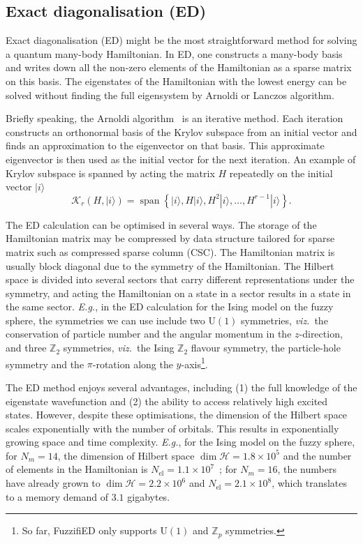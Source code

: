\documentclass{timesjhep}
\begin{document}
\subsection{Exact diagonalisation (ED)}

Exact diagonalisation (ED) might be the most straightforward method for solving a quantum many-body Hamiltonian. In ED, one constructs a many-body basis and writes down all the non-zero elements of the Hamiltonian as a sparse matrix on this basis. The eigenstates of the Hamiltonian with the lowest energy can be solved without finding the full eigensystem by Arnoldi or Lanczos algorithm.

Briefly speaking, the Arnoldi algorithm~\cite{Arnoldi1951} is an iterative method. Each iteration constructs an orthonormal basis of the Krylov subspace from an initial vector and finds an approximation to the eigenvector on that basis. This approximate eigenvector is then used as the initial vector for the next iteration. An example of Krylov subspace is spanned by acting the matrix $H$ repeatedly on the initial vector $|i\rangle$
\begin{equation}
    \mathcal{K}_r(H,|i\rangle)=\operatorname{span}\left\{|i\rangle,H|i\rangle,H^2|i\rangle,\dots,H^{r-1}|i\rangle\right\}.
\end{equation}

The ED calculation can be optimised in several ways. The storage of the Hamiltonian matrix may be compressed by data structure tailored for sparse matrix such as compressed sparse column (CSC). The Hamiltonian matrix is usually block diagonal due to the symmetry of the Hamiltonian. The Hilbert space is divided into several sectors that carry different representations under the symmetry, and acting the Hamiltonian on a state in a sector results in a state in the same sector. \textit{E.g.}, in the ED calculation for the Ising model on the fuzzy sphere, the symmetries we can use include two $\mathrm{U}(1)$ symmetries, \textit{viz.}~the conservation of particle number and the angular momentum in the $z$-direction, and three $\mathbb{Z}_2$ symmetries, \textit{viz.}~the Ising $\mathbb{Z}_2$ flavour symmetry, the particle-hole symmetry and the $\pi$-rotation along the $y$-axis\footnote{So far, FuzzifiED only supports $\mathrm{U}(1)$ and $\mathbb{Z}_p$ symmetries.}.

The ED method enjoys several advantages, including (1) the full knowledge of the eigenstate wavefunction and (2) the ability to access relatively high excited states. However, despite these optimisations, the dimension of the Hilbert space scales exponentially with the number of orbitals. This results in exponentially growing space and time complexity. \textit{E.g.}, for the Ising model on the fuzzy sphere, for $N_m=14$, the dimension of Hilbert space $\dim\mathcal{H}=1.8\times10^5$ and the number of elements in the Hamiltonian is $N_
\textrm{el}=1.1\times 10^7$~; for $N_m=16$, the numbers have already grown to $\dim\mathcal{H}=2.2\times10^6$ and $N_\textrm{el}=2.1\times 10^8$, which translates to a memory demand of $3.1$ gigabytes.
\end{document}
